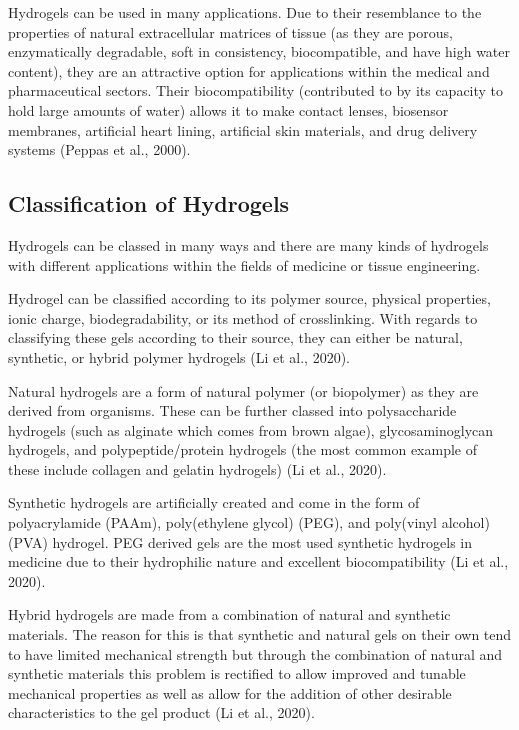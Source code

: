 Hydrogels can be used in many applications. Due to their resemblance to the properties of natural extracellular matrices of tissue (as they are porous, enzymatically degradable, soft in consistency, biocompatible, and have high water content), they are an attractive option for applications within the medical and pharmaceutical sectors. Their biocompatibility (contributed to by its capacity to hold large amounts of water) allows it to make contact lenses, biosensor membranes, artificial heart lining, artificial skin materials, and drug delivery systems (Peppas et al., 2000).

\subsection{Classification of Hydrogels}
Hydrogels can be classed in many ways and there are many kinds of hydrogels with different applications within the fields of medicine or tissue engineering.

Hydrogel can be classified according to its polymer source, physical properties, ionic charge, biodegradability, or its method of crosslinking. With regards to classifying these gels according to their source, they can either be natural, synthetic, or hybrid polymer hydrogels (Li et al., 2020). 

Natural hydrogels are a form of natural polymer (or biopolymer) as they are derived from organisms. These can be further classed into polysaccharide hydrogels (such as alginate which comes from brown algae), glycosaminoglycan hydrogels, and polypeptide/protein hydrogels (the most common example of these include collagen and gelatin hydrogels) (Li et al., 2020).

Synthetic hydrogels are artificially created and come in the form of polyacrylamide (PAAm), poly(ethylene glycol) (PEG), and poly(vinyl alcohol) (PVA) hydrogel. PEG derived gels are the most used synthetic hydrogels in medicine due to their hydrophilic nature and excellent biocompatibility (Li et al., 2020).

Hybrid hydrogels are made from a combination of natural and synthetic materials. The reason for this is that synthetic and natural gels on their own tend to have limited mechanical strength but through the combination of natural and synthetic materials this problem is rectified to allow improved and tunable mechanical properties as well as allow for the addition of other desirable characteristics to the gel product (Li et al., 2020).

